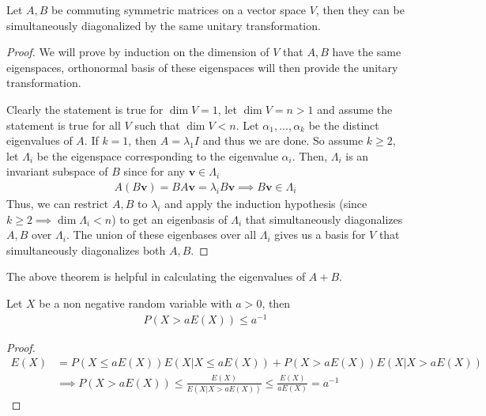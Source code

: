\documentclass{math}
\renewcommand{\vec}[1]{\boldsymbol{#1}}
\begin{document}
\begin{theorem}
    Let $A, B$ be commuting symmetric matrices on a vector space $V$, then they can be simultaneously diagonalized by the same unitary transformation.
\end{theorem}
\begin{proof}
    We will prove by induction on the dimension of $V$ that $A, B$ have the same eigenspaces,
    orthonormal basis of these eigenspaces will then provide the unitary transformation.

    Clearly the statement is true for $\dim V = 1$, let $\dim V = n > 1$ and assume the statement is true for all $V$ such that $\dim V < n$.
    Let $\alpha_1, ..., \alpha_k$ be the distinct eigenvalues of $A$. If $k = 1$, then $A = \lambda_1 I$ and thus we are done.
    So assume $k \geq 2$, let $\Lambda_i$ be the eigenspace corresponding to the eigenvalue $\alpha_i$.
    Then, $\Lambda_i$ is an invariant subspace of $B$ since for any $\vec{v} \in \Lambda_i$
    \begin{align*}
        A(B\vec{v}) = BA\vec{v} = \lambda_i B \vec{v} \implies B\vec{v} \in \Lambda_i
    \end{align*}
    Thus, we can restrict $A, B$ to $\lambda_i$ and apply the induction hypothesis (since $k \geq 2 \implies \dim \Lambda_i < n$)
    to get an eigenbasis of $\Lambda_i$ that simultaneously diagonalizes $A, B$ over $\Lambda_i$. The union of these eigenbases over all $\Lambda_i$ gives us a basis for $V$
    that simultaneously diagonalizes both $A, B$.
\end{proof}

The above theorem is helpful in calculating the eigenvalues of $A + B$.

\begin{theorem}
    Let $X$ be a non negative random variable with $a > 0$, then
    \begin{align*}
        P(X > a E(X)) \leq a^{-1}
    \end{align*}
\end{theorem}
\begin{proof}
    \begin{align*}
        E(X) & = P(X \leq a E(X)) E(X | X \leq a E(X)) + P(X > a E(X)) E(X | X > a E(X))                  \\
             & \implies P(X > a E(X)) \leq \frac{E(X)}{E(X | X > aE(X))} \leq \frac{E(X)}{aE(X)} = a^{-1}
    \end{align*}
\end{proof}
\end{document}
